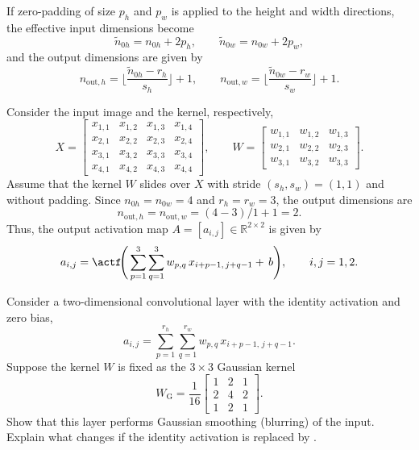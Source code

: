 \begin{remark}[Padding]

If zero-padding of size $p_h$ and $p_w$ is applied to the height and width directions,
the effective input dimensions become
$$
\tilde{n}_{0h} = n_{0h} + 2p_h, \qquad \tilde{n}_{0w} = n_{0w} + 2p_w,
$$
and the output dimensions are given by
$$
n_{\text{out},h} = 
\Big\lfloor \frac{\tilde{n}_{0h} - r_h}{s_h} \Big\rfloor + 1,
\qquad
n_{\text{out},w} =
\Big\lfloor \frac{\tilde{n}_{0w} - r_w}{s_w} \Big\rfloor + 1.
$$
\end{remark}
\begin{example}
Consider the input image and the kernel, respectively,
\[
X =
\begin{bmatrix}
x_{1,1} & x_{1,2} & x_{1,3} & x_{1,4} \\
x_{2,1} & x_{2,2} & x_{2,3} & x_{2,4} \\
x_{3,1} & x_{3,2} & x_{3,3} & x_{3,4} \\
x_{4,1} & x_{4,2} & x_{4,3} & x_{4,4}
\end{bmatrix},
\qquad
W =
\begin{bmatrix}
w_{1,1} & w_{1,2} & w_{1,3} \\
w_{2,1} & w_{2,2} & w_{2,3} \\
w_{3,1} & w_{3,2} & w_{3,3}
\end{bmatrix}.
\]
Assume that the kernel $W$ slides over $X$ with stride $(s_h, s_w) = (1,1)$ 
and without padding.  
Since $ n_{0h}= n_{0w} = 4$ and $r_h = r_w = 3$, the output dimensions are
\[
n_{\text{out},h} = n_{\text{out},w} = (4 - 3)/1 + 1 = 2.
\]
Thus, the output activation map $A = [a_{i,j}] \in \mathbb{R}^{2\times2}$ is given by
\[
a_{i,j} = \actf\!\Bigg(
\sum_{p=1}^{3}\sum_{q=1}^{3}
w_{p,q}\, x_{i+p-1,\,j+q-1} +\,b
\Bigg),
\qquad i,j = 1,2.
\]
\end{example}
\begin{problem}
Consider a two-dimensional convolutional layer with the identity activation and zero bias,
$$
a_{i,j} = \sum_{p=1}^{r_h}\sum_{q=1}^{r_w} w_{p,q}\,x_{i+p-1,\,j+q-1}.
$$
Suppose the kernel $W$ is fixed as the $3\times3$ Gaussian kernel
$$
W_{\text{G}} = \frac{1}{16}
\begin{bmatrix}
1 & 2 & 1\\
2 & 4 & 2\\
1 & 2 & 1
\end{bmatrix}.
$$
Show that this layer performs Gaussian smoothing (blurring) of the input.
Explain what changes if the identity activation is replaced by \ReLU.
\end{problem}

